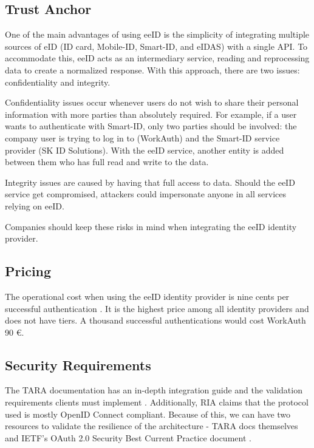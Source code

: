 \subsection{Trust Anchor}

One of the main advantages of using eeID is the simplicity of integrating multiple sources of eID (ID card, Mobile-ID, Smart-ID, and eIDAS) with a single API. To accommodate this, eeID acts as an intermediary service, reading and reprocessing data to create a normalized response. With this approach, there are two issues: confidentiality and integrity.

Confidentiality issues occur whenever users do not wish to share their personal information with more parties than absolutely required. For example, if a user wants to authenticate with Smart-ID, only two parties should be involved: the company user is trying to log in to (WorkAuth) and the Smart-ID service provider (SK ID Solutions). With the eeID service, another entity is added between them who has full read and write to the data.

Integrity issues are caused by having that full access to data. Should the eeID service get compromised, attackers could impersonate anyone in all services relying on eeID.

Companies should keep these risks in mind when integrating the eeID identity provider.

\subsection{Pricing}

The operational cost when using the eeID identity provider is nine cents per successful authentication \cite{eeid-pricing}. It is the highest price among all identity providers and does not have tiers. A thousand successful authentications would cost WorkAuth 90 €.

\subsection{Security Requirements}

The TARA documentation has an in-depth integration guide and the validation requirements clients must implement \cite{tara-technical}. Additionally, RIA claims that the protocol used is mostly OpenID Connect compliant. Because of this, we can have two resources to validate the resilience of the architecture - TARA docs themselves \cite{tara-technical} and IETF's OAuth 2.0 Security Best Current Practice document \cite{ietf-oauth-security-topics-19}.

